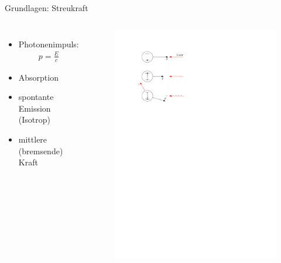 \documentclass[12pt]{beamer}
\begin{document}
\begin{frame}{Grundlagen: Streukraft}
	\begin{columns}[t]
		\begin{itemize}
			\item Photonenimpuls:
			\begin{align}
			p = \frac{E}{c}
			\end{align}
			\item Absorption
			\item spontante Emission (Isotrop)
			\item mittlere (bremsende) Kraft
		\end{itemize}
		
		\begin{figure}[h]
			\centering
			\includegraphics[width=1.0\textwidth]{./figures/streukraft.pdf}
		\end{figure}
		
	\end{columns}

\end{frame}
\end{document}
